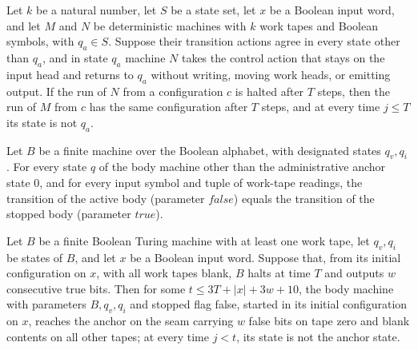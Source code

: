 \begin{lemma}
\label{Complexity.enumCont_halt_transfer}
\leanok
{}
Let $k$ be a natural number, let $S$ be a state set, let $x$ be a Boolean input word,
and let $M$ and $N$ be deterministic machines with $k$ work tapes and Boolean symbols,
with $q_a\in S$. Suppose their transition actions agree in every state other than $q_a$,
and in state $q_a$ machine $N$ takes the control action that stays on the input head and
returns to $q_a$ without writing, moving work heads, or emitting output. If the run of
$N$ from a configuration $c$ is halted after $T$ steps, then the run of $M$ from $c$ has
the same configuration after $T$ steps, and at every time $j\le T$ its state is not
$q_a$.
\end{lemma}

\begin{lemma}
\label{Complexity.enumCont_body_agree}
\leanok
{}
Let $B$ be a finite machine over the Boolean alphabet, with designated states $q_v,q_i$.
For every state $q$ of the body machine other than the administrative anchor state $0$,
and for every input symbol and tuple of work-tape readings, the transition of the active
body (parameter $false$) equals the transition of the stopped body (parameter $true$).
\end{lemma}

\begin{lemma}
\label{Complexity.enumCont_body_start_guarded}
\leanok
{}
Let $B$ be a finite Boolean Turing machine with at least one work tape, let $q_v,q_i$ be
states of $B$, and let $x$ be a Boolean input word. Suppose that, from its initial
configuration on $x$, with all work tapes blank, $B$ halts at time $T$ and outputs $w$
consecutive true bits. Then for some $t\le 3T+|x|+3w+10$, the body machine with
parameters $B,q_v,q_i$ and stopped flag false, started in its initial configuration on
$x$, reaches the anchor on the seam carrying $w$ false bits on tape zero and blank
contents on all other tapes; at every time $j<t$, its state is not the anchor state.
\end{lemma}

